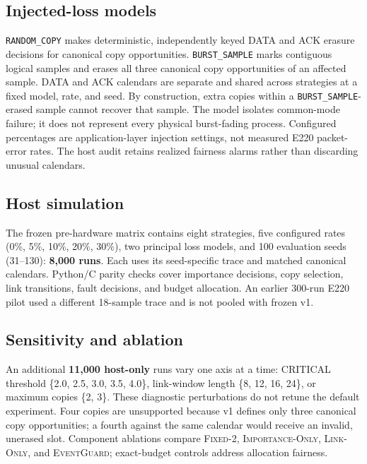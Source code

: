 \documentclass[11pt]{article}
\newcommand{\EG}{\textsc{EventGuard}}
\newcommand{\IO}{\textsc{Importance-Only}}
\newcommand{\LO}{\textsc{Link-Only}}
\newcommand{\Ftwo}{\textsc{Fixed-2}}
\begin{document}
\subsection{Injected-loss models}\label{sec:injected-loss-models}

\texttt{RANDOM\_COPY} makes deterministic, independently keyed DATA and ACK erasure decisions for canonical copy opportunities. \texttt{BURST\_SAMPLE} marks contiguous logical samples and erases all three canonical copy opportunities of an affected sample. DATA and ACK calendars are separate and shared across strategies at a fixed model, rate, and seed. By construction, extra copies within a \texttt{BURST\_SAMPLE}-erased sample cannot recover that sample. The model isolates common-mode failure; it does not represent every physical burst-fading process. Configured percentages are application-layer injection settings, not measured E220 packet-error rates. The host audit retains realized fairness alarms rather than discarding unusual calendars.

\subsection{Host simulation}\label{sec:host-simulation}

The frozen pre-hardware matrix contains eight strategies, five configured rates (0\%, 5\%, 10\%, 20\%, 30\%), two principal loss models, and 100 evaluation seeds (31--130): \textbf{8,000 runs}. Each uses its seed-specific trace and matched canonical calendars. Python/C parity checks cover importance decisions, copy selection, link transitions, fault decisions, and budget allocation. An earlier 300-run E220 pilot used a different 18-sample trace and is not pooled with frozen v1.

\subsection{Sensitivity and ablation}\label{sec:sensitivity-and-ablation}

An additional \textbf{11,000 host-only} runs vary one axis at a time: CRITICAL threshold \{2.0, 2.5, 3.0, 3.5, 4.0\}, link-window length \{8, 12, 16, 24\}, or maximum copies \{2, 3\}. These diagnostic perturbations do not retune the default experiment. Four copies are unsupported because v1 defines only three canonical copy opportunities; a fourth against the same calendar would receive an invalid, unerased slot. Component ablations compare \Ftwo{}, \IO{}, \LO{}, and \EG{}; exact-budget controls address allocation fairness.
\end{document}
